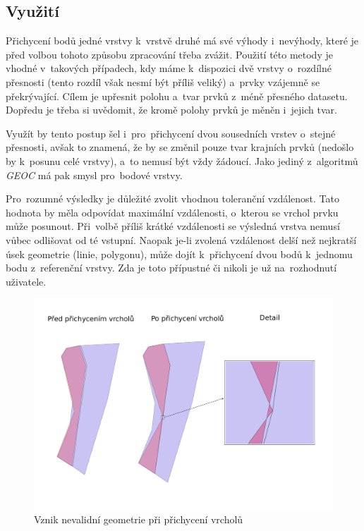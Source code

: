 \subsection{Využití}
\label{vs-vyuziti}

Přichycení bodů jedné vrstvy k~vrstvě druhé má své výhody i~nevýhody, které je před volbou tohoto způsobu zpracování třeba zvážit. Použití této metody je vhodné v~takových
případech, kdy máme k~dispozici dvě vrstvy o~rozdílné přesnosti (tento rozdíl však nesmí být příliš veliký) a~prvky vzájemně se překrývající.
Cílem je upřesnit polohu a~tvar prvků z~méně přesného datasetu. Dopředu je třeba si uvědomit, že kromě polohy prvků je měněn i~jejich tvar.

Využít by tento postup šel i~pro~přichycení dvou sousedních vrstev o~stejné přesnosti, avšak to znamená, že by se změnil pouze tvar krajních prvků (nedošlo by k~posunu 
celé vrstvy), a~to nemusí být vždy žádoucí. Jako jediný z~algoritmů \textit{GEOC} má pak smysl pro~bodové vrstvy.

Pro~rozumné výsledky je důležité zvolit vhodnou toleranční vzdálenost. Tato hodnota by měla odpovídat maximální vzdálenosti, o~kterou se vrchol prvku může posunout. Při~volbě
příliš krátké vzdálenosti se výsledná vrstva nemusí vůbec odlišovat od té vstupní. Naopak \mbox{je-li} zvolená vzdálenost delší než nejkratší úsek geometrie (linie, polygonu),
může dojít k~přichycení dvou bodů k~jednomu bodu z~referenční vrstvy. Zda je toto přípustné či nikoli je už na~rozhodnutí uživatele.

\label{vsinvalid}
  \begin{figure}[hbt]
    \centering
      \includegraphics[width=350pt]{./pictures/vs-invalid.pdf}
      \caption{Vznik nevalidní geometrie při přichycení vrcholů }
      \label{fig:vs-nevalidni}
  \end{figure} 

